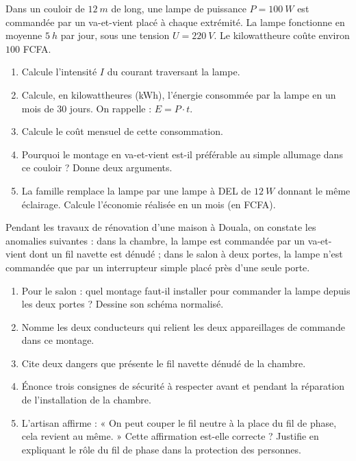 \documentclass[11pt]{article}
\begin{document}
\begin{exercice}
Dans un couloir de $\SI{12}{m}$ de long, une lampe de puissance $P = \SI{100}{W}$ est commandée par un va-et-vient placé à chaque extrémité. La lampe fonctionne en moyenne $\SI{5}{h}$ par jour, sous une tension $U = \SI{220}{V}$. Le kilowattheure coûte environ $100$ FCFA.
\begin{enumerate}
\item Calcule l'intensité $I$ du courant traversant la lampe.
\item Calcule, en kilowattheures (kWh), l'énergie consommée par la lampe en un mois de $30$ jours. On rappelle : $E = P \cdot t$.
\item Calcule le coût mensuel de cette consommation.
\item Pourquoi le montage en va-et-vient est-il préférable au simple allumage dans ce couloir ? Donne deux arguments.
\item La famille remplace la lampe par une lampe à DEL de $\SI{12}{W}$ donnant le même éclairage. Calcule l'économie réalisée en un mois (en FCFA).
\end{enumerate}
\end{exercice}

\begin{exercice}
Pendant les travaux de rénovation d'une maison à Douala, on constate les anomalies suivantes : dans la chambre, la lampe est commandée par un va-et-vient dont un fil navette est dénudé ; dans le salon à deux portes, la lampe n'est commandée que par un interrupteur simple placé près d'une seule porte.
\begin{enumerate}
\item Pour le salon : quel montage faut-il installer pour commander la lampe depuis les deux portes ? Dessine son schéma normalisé.
\item Nomme les deux conducteurs qui relient les deux appareillages de commande dans ce montage.
\item Cite deux dangers que présente le fil navette dénudé de la chambre.
\item Énonce trois consignes de sécurité à respecter avant et pendant la réparation de l'installation de la chambre.
\item L'artisan affirme : « On peut couper le fil neutre à la place du fil de phase, cela revient au même. » Cette affirmation est-elle correcte ? Justifie en expliquant le rôle du fil de phase dans la protection des personnes.
\end{enumerate}
\end{exercice}
\end{document}
